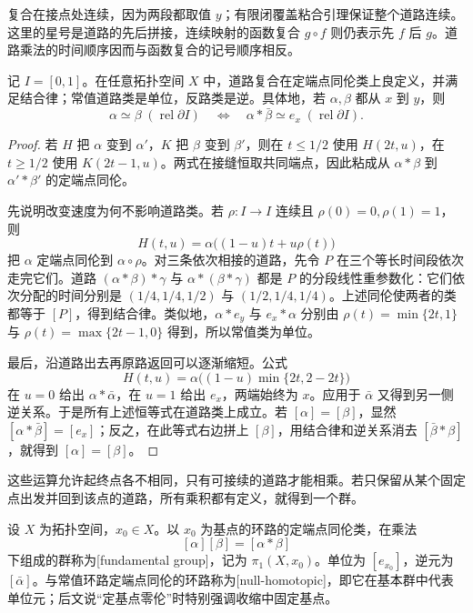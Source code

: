 复合在接点处连续，因为两段都取值 \(y\)；有限闭覆盖粘合引理保证整个道路连续。这里的星号是道路的先后拼接，连续映射的函数复合 \(g\circ f\) 则仍表示先 \(f\) 后 \(g\)。道路乘法的时间顺序因而与函数复合的记号顺序相反。

\begin{proposition}\label{g1:prop:path-classes}
	记 \(I=[0,1]\)。在任意拓扑空间 \(X\) 中，道路复合在定端点同伦类上良定义，并满足结合律；常值道路类是单位，反路类是逆。具体地，若 \(\alpha,\beta\) 都从 \(x\) 到 \(y\)，则
	\[
		\alpha\simeq\beta\;(\operatorname{rel}\partial I)
		\quad\Longleftrightarrow\quad
		\alpha*\bar\beta\simeq e_x\;(\operatorname{rel}\partial I).
	\]
\end{proposition}
\begin{proof}
	若 \(H\) 把 \(\alpha\) 变到 \(\alpha'\)，\(K\) 把 \(\beta\) 变到 \(\beta'\)，则在 \(t\le1/2\) 使用 \(H(2t,u)\)，在 \(t\ge1/2\) 使用 \(K(2t-1,u)\)。两式在接缝恒取共同端点，因此粘成从 \(\alpha*\beta\) 到 \(\alpha'*\beta'\) 的定端点同伦。

	先说明改变速度为何不影响道路类。若 \(\rho:I\rightarrow I\) 连续且 \(\rho(0)=0,\rho(1)=1\)，则
	\[
		H(t,u)=\alpha\bigl((1-u)t+u\rho(t)\bigr)
	\]
	把 \(\alpha\) 定端点同伦到 \(\alpha\circ\rho\)。对三条依次相接的道路，先令 \(P\) 在三个等长时间段依次走完它们。道路 \((\alpha*\beta)*\gamma\) 与 \(\alpha*(\beta*\gamma)\) 都是 \(P\) 的分段线性重参数化：它们依次分配的时间分别是 \((1/4,1/4,1/2)\) 与 \((1/2,1/4,1/4)\)。上述同伦使两者的类都等于 \([P]\)，得到结合律。类似地，\(\alpha*e_y\) 与 \(e_x*\alpha\) 分别由 \(\rho(t)=\min\{2t,1\}\) 与 \(\rho(t)=\max\{2t-1,0\}\) 得到，所以常值类为单位。

	最后，沿道路出去再原路返回可以逐渐缩短。公式
	\[
		H(t,u)=\alpha\bigl((1-u)\min\{2t,2-2t\}\bigr)
	\]
	在 \(u=0\) 给出 \(\alpha*\bar\alpha\)，在 \(u=1\) 给出 \(e_x\)，两端始终为 \(x\)。应用于 \(\bar\alpha\) 又得到另一侧逆关系。于是所有上述恒等式在道路类上成立。若 \([\alpha]=[\beta]\)，显然 \([\alpha*\bar\beta]=[e_x]\)；反之，在此等式右边拼上 \([\beta]\)，用结合律和逆关系消去 \([\bar\beta*\beta]\)，就得到 \([\alpha]=[\beta]\)。
\end{proof}

这些运算允许起终点各不相同，只有可接续的道路才能相乘。若只保留从某个固定点出发并回到该点的道路，所有乘积都有定义，就得到一个群。

\begin{definition}[基本群]\label{g1:def:fundamental-group}
	设 \(X\) 为拓扑空间，\(x_0\in X\)。以 \(x_0\) 为基点的环路的定端点同伦类，在乘法
	\[
		[\alpha][\beta]=[\alpha*\beta]
	\]
	下组成的群称为[fundamental group]，记为 \(\pi_1(X,x_0)\)。单位为 \([e_{x_0}]\)，逆元为 \([\bar\alpha]\)。与常值环路定端点同伦的环路称为[null-homotopic]，即它在基本群中代表单位元；后文说“定基点零伦”时特别强调收缩中固定基点。
\end{definition}

